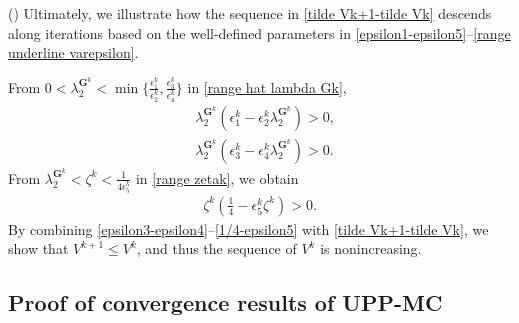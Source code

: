 \documentclass[12pt,draftcls,onecolumn]{IEEEtran}
\begin{document}
() Ultimately, we illustrate how the sequence in \eqref{tilde Vk+1-tilde Vk} descends along iterations based on the well-defined parameters in \eqref{epsilon1-epsilon5}--\eqref{range underline varepsilon}.

From $0 < \lambda_{2}^{\mathbf{G}^k} < \min\{\frac{{\epsilon_1^k}}{{\epsilon_2^k}}, \frac{{\epsilon_3^k}}{\epsilon_4^k}\}$ in \eqref{range hat lambda Gk},
\begin{align}
	\label{epsilon3-epsilon4} & \lambda_{2}^{\mathbf{G}^k} ({\epsilon_1^k} - {\epsilon_2^k} \lambda_{2}^{\mathbf{G}^k})> 0 ,\\
    &\lambda_{2}^{\mathbf{G}^k}({\epsilon_3^k} - \epsilon_4^k \lambda_{2}^{\mathbf{G}^k})> 0.
\end{align}
From $\lambda_{2}^{\mathbf{G}^k}<{\zeta^k}<\frac{1}{4\epsilon_{5}^k}$ in \eqref{range zetak}, we obtain
\begin{align}
	{\zeta^k}(\frac{1}{4} - {\epsilon_{5}^k} {\zeta^k}) >0 .\label{1/4-epsilon5}
\end{align}
By combining \eqref{epsilon3-epsilon4}--\eqref{1/4-epsilon5} with \eqref{tilde Vk+1-tilde Vk}, we show that $V^{k+1}\leq V^k$, and thus the sequence of $V^k$ is nonincreasing.

\subsection{Proof of convergence results of UPP-MC}
\end{document}
